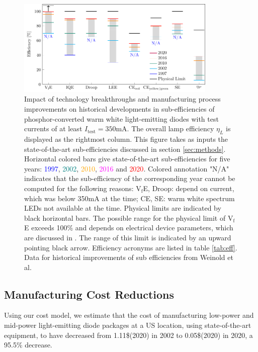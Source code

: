 \documentclass[a4paper,nocompress]{spie}  %
\begin{document}
    \begin{figure} [ht]
        \begin{center}
            \includegraphics[width=0.85\textwidth]{SPIE/article/breakthroughs_efficiency.pdf}
        \end{center}
        \caption{Impact of technology breakthroughs and manufacturing process improvements on historical developments in sub-efficiencies of phosphor-converted warm white light-emitting diodes with test currents of at least $I_\text{test}=350$mA. The overall lamp efficiency $\eta_L$ is displayed as the rightmost column. This figure takes as inputs the state-of-the-art sub-efficiencies discussed in section \ref{sec:methods}. Horizontal colored bars give state-of-the-art sub-efficiencies for five years: \textcolor{blue}{1997}, \textcolor{teal}{2002}, \textcolor{orange}{2010}, \textcolor{magenta}{2016} and \textcolor{red}{2020}. Colored annotation "N/A" indicates that the sub-efficiency of the corresponding year cannot be computed for the following reasons: V$_\text{f}$E, Droop: depend on current, which was below 350mA at the time; CE, SE: warm white spectrum LEDs not available at the time. Physical limits are indicated by black horizontal bars. The possible range for the physical limit of V$_\text{f}$E exceeds 100\% and depends on electrical device parameters, which are discussed in \cite{david2016electrical}. The range of this limit is indicated by an upward pointing black arrow. Efficiency acronyms are listed in table \ref{tab:eff}. Data for historical improvements of sub efficiencies from Weinold et al. \cite{weinold2020technology}}
        \label{fig:efficiency}
    \end{figure}

\subsection{Manufacturing Cost Reductions}

    Using our cost model, we estimate that the cost of manufacturing low-power and mid-power light-emitting diode packages at a US location, using state-of-the-art equipment, to have decreased from 1.11\$(2020) in 2002 to 0.05\$(2020) in 2020, a 95.5\% decrease. 
    
\end{document}
